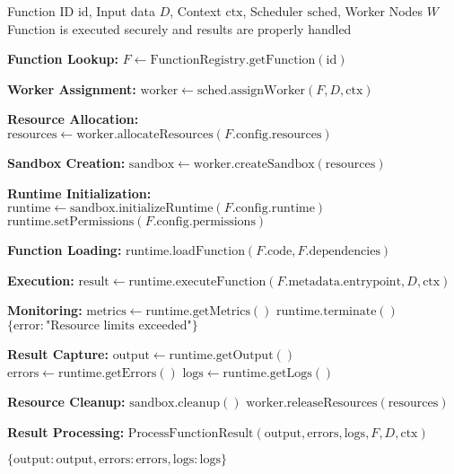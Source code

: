 \begin{protocol}
\label{prot:function-execution}
\begin{algorithmic}[1]
\Require Function ID $\text{id}$, Input data $D$, Context $\text{ctx}$, Scheduler $\text{sched}$, Worker Nodes $W$
\Ensure Function is executed securely and results are properly handled

\State \textbf{Function Lookup:}
\State $F \gets \text{FunctionRegistry}.\text{getFunction}(\text{id})$

\State \textbf{Worker Assignment:}
\State $\text{worker} \gets \text{sched}.\text{assignWorker}(F, D, \text{ctx})$

\State \textbf{Resource Allocation:}
\State $\text{resources} \gets \text{worker}.\text{allocateResources}(F.\text{config}.\text{resources})$

\State \textbf{Sandbox Creation:}
\State $\text{sandbox} \gets \text{worker}.\text{createSandbox}(\text{resources})$

\State \textbf{Runtime Initialization:}
\State $\text{runtime} \gets \text{sandbox}.\text{initializeRuntime}(F.\text{config}.\text{runtime})$
\State $\text{runtime}.\text{setPermissions}(F.\text{config}.\text{permissions})$

\State \textbf{Function Loading:}
\State $\text{runtime}.\text{loadFunction}(F.\text{code}, F.\text{dependencies})$

\State \textbf{Execution:}
\State $\text{result} \gets \text{runtime}.\text{executeFunction}(F.\text{metadata}.\text{entrypoint}, D, \text{ctx})$

\State \textbf{Monitoring:}
    \State $\text{metrics} \gets \text{runtime}.\text{getMetrics}()$
        \State $\text{runtime}.\text{terminate}()$
        \State \Return $\{\text{error}: \text{"Resource limits exceeded"}\}$
    \EndIf
\EndWhile

\State \textbf{Result Capture:}
\State $\text{output} \gets \text{runtime}.\text{getOutput}()$
\State $\text{errors} \gets \text{runtime}.\text{getErrors}()$
\State $\text{logs} \gets \text{runtime}.\text{getLogs}()$

\State \textbf{Resource Cleanup:}
\State $\text{sandbox}.\text{cleanup}()$
\State $\text{worker}.\text{releaseResources}(\text{resources})$

\State \textbf{Result Processing:}
\State $\text{ProcessFunctionResult}(\text{output}, \text{errors}, \text{logs}, F, D, \text{ctx})$

\State \Return $\{\text{output}: \text{output}, \text{errors}: \text{errors}, \text{logs}: \text{logs}\}$
\end{algorithmic}
\end{protocol}
